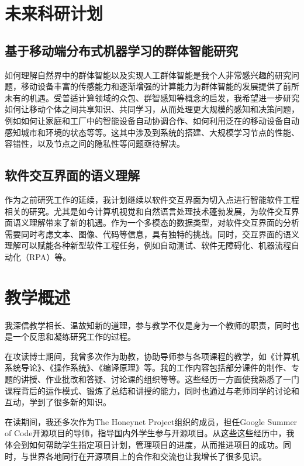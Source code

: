 \documentclass[12pt]{article}
\begin{document}
\section{未来科研计划}

\subsection{基于移动端分布式机器学习的群体智能研究}
如何理解自然界中的群体智能以及实现人工群体智能是我个人非常感兴趣的研究问题，移动设备丰富的传感能力和逐渐增强的计算能力为群体智能的发展提供了前所未有的机遇。受普适计算领域的众包、群智感知等概念的启发，我希望进一步研究如何让移动个体之间共享知识、共同学习，从而处理更大规模的感知和决策问题，例如如何让家庭和工厂中的智能设备自动协调合作、如何利用泛在的移动设备自动感知城市和环境的状态等等。这其中涉及到系统的搭建、大规模学习节点的性能、容错性，以及节点之间的隐私性等问题亟待解决。

\subsection{软件交互界面的语义理解}
作为之前研究工作的延续，我计划继续以软件交互界面为切入点进行智能软件工程相关的研究。尤其是如今计算机视觉和自然语言处理技术蓬勃发展，为软件交互界面语义理解带来了新的机遇。作为一个多模态的数据类型，对软件交互界面的分析需要同时考虑文本、图像、代码等信息，具有独特的挑战。同时，交互界面的语义理解可以赋能各种新型软件工程任务，例如自动测试、软件无障碍化、机器流程自动化（RPA）等。

\section{教学概述}

我深信教学相长、温故知新的道理，参与教学不仅是身为一个教师的职责，同时也是一个反思和凝练研究工作的过程。

在攻读博士期间，我曾多次作为助教，协助导师参与各项课程的教学，如《计算机系统导论》、《操作系统》、《编译原理》等。我的工作内容包括部分课件的制作、专题的讲授、作业批改和答疑、讨论课的组织等等。这些经历一方面使我熟悉了一门课程背后的运作模式、锻炼了总结和讲授的能力，同时也通过与老师同学的讨论和互动，学到了很多新的知识。

在读期间，我还多次作为The Honeynet Project组织的成员，担任Google Summer of Code开源项目的导师，指导国内外学生参与开源项目。从这些这些经历中，我体会到如何帮助学生指定项目计划，管理项目的进度，从而推进项目的成功。同时，与世界各地同行在开源项目上的合作和交流也让我增长了很多见识。
\end{document}
